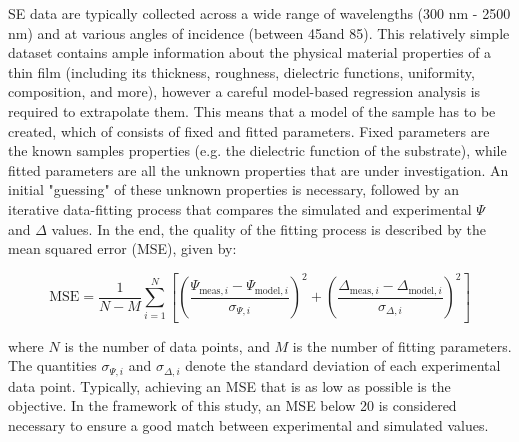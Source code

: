 SE data are typically collected across a wide range of wavelengths (300 nm - 2500 nm) and at various angles of incidence (between 45\degree and 85\degree). This relatively simple dataset contains ample information about the physical material properties of a thin film (including its thickness, roughness, dielectric functions, uniformity, composition, and more), however a careful model-based regression analysis is required to extrapolate them. This means that a model of the sample has to be created, which of consists of fixed and fitted parameters. Fixed parameters are the known samples properties (e.g. the dielectric function of the substrate), while fitted parameters are all the unknown properties that are under investigation. An initial "guessing" of these unknown properties is necessary, followed by an iterative data-fitting process that compares the simulated and experimental $\Psi$ and $\Delta$ values. In the end, the quality of the fitting process is described by the mean squared error (MSE), given by: 


\begin{equation}
\text{MSE} = \frac{1}{N - M} \sum_{i=1}^{N} \left[ \left( \frac{\Psi_{\text{meas},i} - \Psi_{\text{model},i}}{\sigma_{\Psi,i}} \right)^2 + \left( \frac{\Delta_{\text{meas},i} - \Delta_{\text{model},i}}{\sigma_{\Delta,i}} \right)^2 \right]
\label{eq:mse}
\end{equation}

where \( N \) is the number of data points, and \( M \) is the number of fitting parameters. The quantities \( \sigma_{\Psi,i} \) and \( \sigma_{\Delta,i} \) denote the standard deviation of each experimental data point. Typically, achieving an MSE that is as low as possible is the objective. In the framework of this study, an MSE below 20 is considered necessary to ensure a good match between experimental and simulated values. 


